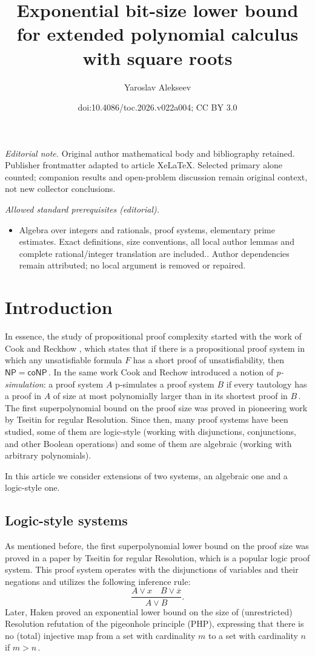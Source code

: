 \documentclass[11pt]{article}
\title{Exponential bit-size lower bound for extended polynomial calculus with square roots}
\author{Yaroslav Alekseev}
\date{doi:10.4086/toc.2026.v022a004; CC BY 3.0}
\begin{document}
\maketitle
\noindent\textit{Editorial note.} Original author mathematical body and bibliography retained. Publisher frontmatter adapted to article XeLaTeX. Selected primary alone counted; companion results and open-problem discussion remain original context, not new collector conclusions.\par\medskip
\noindent\textit{Allowed standard prerequisites (editorial).}\begin{itemize}
\item Algebra over integers and rationals, proof systems, elementary prime estimates. Exact definitions, size conventions, all local author lemmas and complete rational/integer translation are included.. Author dependencies remain attributed; no local argument is removed or repaired.
\end{itemize}\medskip
\section{Introduction}
In essence, the study of propositional proof complexity started with the work of Cook and Reckhow \cite{CR79}, which states that if there is a propositional proof system in which any unsatisfiable formula $F$ has a short proof of unsatisfiability, then %
$\mathsf{NP} = \mathsf{coNP}\,.$ %
 In the same work Cook and Rechow introduced a notion of \textit{p-simulation}: a proof system
$A$ p-simulates a proof system $B$ if every tautology has a proof in $A$ of size at most polynomially larger than in its shortest proof in %
$B\,.$ %
 The first %
  superpolynomial 
bound on the proof size was proved in %
pioneering work by  %
Tseitin \cite{Tse68} for regular %
Resolution. %
Since then, many proof systems have been studied, some of them are logic-style (working with disjunctions, conjunctions, and other Boolean operations) and some of them are algebraic (working with arbitrary polynomials).

In this %
article  %
we consider extensions of two systems, an algebraic one and a logic-style one. 

%
\subsection{Logic-style systems} %
As %
mentioned before, the first superpolynomial
lower  %
bound on the proof size was proved in %
a paper by  %
Tseitin for regular %
Resolution, %
%
which is a popular logic proof system. This proof system operates with the disjunctions of variables and their negations and utilizes the following inference rule:
$$
\frac{A \vee x \quad B \vee \overline{x}}{A \vee B}.
$$
Later, Haken \cite{Hak85} proved an exponential lower bound on the size of (unrestricted) Resolution refutation of the pigeonhole principle (PHP), expressing that there is no (total)
injective map from a set with cardinality $m$ to a set with cardinality $n$ if %
$m > n\,.$ %
\end{document}
